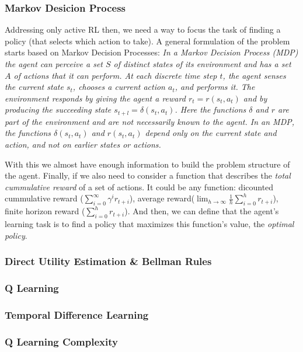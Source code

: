 \subsubsection{Markov Desicion Process} \label{mdp}

Addressing only active RL then, we need a way to focus the task of finding a policy (that selects which action to take). A general formulation of the problem starts based on Markov Decision Processes: \textit{In a Markov Decision Process (MDP) the agent can perceive a set $S$ of distinct states of its environment and has a set $A$ of actions that it can perform. At each discrete time step $t$, the agent senses the current state $s_t$, chooses a current action $a_t$, and performs it. The environment responds by giving the agent a reward $r_t = r(s_t,a_t)$ and by producing the succeeding state $s_{t+l}= \delta (s_t,a_t)$. Here the functions $\delta$ and $r$ are part of the environment and are not necessarily known to the agent. In an MDP, the functions $\delta (s_t,a_t)$ and $r(s_t,a_t)$ depend only on the current state and action, and not on earlier states or actions.}\cite[p370]{ml_tom_mitchel} 

With this we almost have enough information to build the problem structure of the agent. Finally, if we also need to consider a function that describes the  \emph{total cummulative reward} of a set of actions. It could be any function: dicounted cummulative reward ($\sum^{\infty}_{i=0}\gamma^ir_{t+i}$), average reward($\lim_{h\to\infty}\frac{1}{h}\sum^{h}_{i=0}r_{t+i}$), finite horizon reward ($\sum^{h}_{i=0}r_{t+i}$). And then, we can define that the agent's learning task is to find a policy that maximizes this function's value, the \emph{optimal policy}.\cite{ml_tom_mitchel}


\subsubsection{Direct Utility Estimation \& Bellman Rules}


\subsubsection{Q Learning}


\subsubsection{Temporal Difference Learning}


\subsubsection{Q Learning Complexity}



